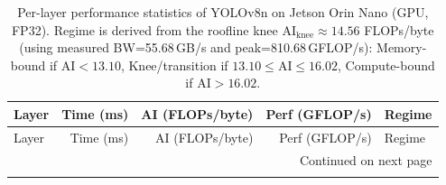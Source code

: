 \documentclass[12pt,a4paper]{report}
\begin{document}
\begin{longtable}{p{} r r r p{}}
\caption{Per-layer performance statistics of YOLOv8n on Jetson Orin Nano (GPU, FP32). Regime is derived from the
roofline knee $\mathrm{AI}_{\mathrm{knee}}\approx 14.56$ FLOPs/byte (using measured BW=55.68\,GB/s and peak=810.68\,GFLOP/s):
Memory-bound if AI$<13.10$, Knee/transition if $13.10\le$AI$\le 16.02$, Compute-bound if AI$>16.02$.}
\label{tab:roofline_orin_layers_all}\\

\toprule
Layer & Time (ms) & AI (FLOPs/byte) & Perf (GFLOP/s) & Regime \\
\midrule
\endfirsthead

\toprule
Layer & Time (ms) & AI (FLOPs/byte) & Perf (GFLOP/s) & Regime \\
\midrule
\endhead

\midrule
\multicolumn{5}{r}{\small Continued on next page} \\
\endfoot

\bottomrule
\endlastfoot


\end{longtable}
\end{document}
